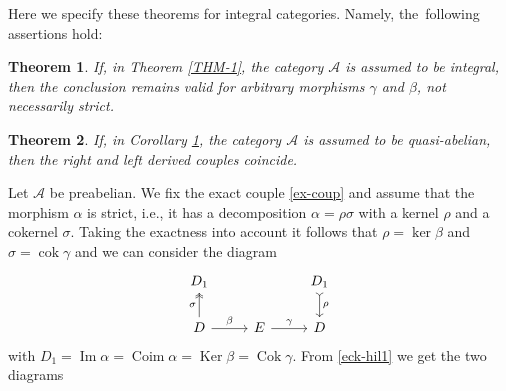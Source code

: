 \documentclass[a4paper,10pt,reqno]{amsart}
\newtheorem{thm}{Theorem}[section]
\newcommand{\Ker}{\operatorname{Ker}\nolimits}
\newcommand{\Cok}{\operatorname{Cok}\nolimits}
\newcommand{\cok}{\operatorname{cok}\nolimits}
\renewcommand{\Im}{\operatorname{Im}\nolimits}
\newcommand{\Coim}{\operatorname{Coim}\nolimits}
\begin{document}
	Here we specify these theorems for integral categories. Namely, the~following assertions hold: 
	
	\begin{thm}\label{COR-1}
		If, in Theorem \ref{THM-1}, the category $\mathcal{A}$ is assumed to be integral, then the conclusion remains valid for arbitrary morphisms $\gamma$ and $\beta$, not necessarily strict.
	\end{thm}
	
	\begin{thm}\label{COR-2}
		If, in Corollary \ref{COR-1}, the category $\mathcal{A}$ is assumed to be quasi-abelian, then the right and left derived couples coincide.
	\end{thm}
	
	\smallskip
	
	Let $\mathcal{A}$ be preabelian. We fix the exact couple \eqref{ex-coup} and assume that the morphism $\alpha$ is strict, i.e., it has a decomposition $\alpha=\rho\sigma$ with a kernel $\rho$ and a cokernel $\sigma$. Taking the exactness into account it follows that $\rho=\ker\beta$ and $\sigma=\cok\gamma$ and we can consider the diagram
	\begin{equation}\label{eck-hil1}
		\begin{tikzcd}
			D_1  & &D_1 \arrow[tail]{d}{\rho}\\
			D \arrow[two heads]{u}{\sigma} \arrow[]{r}{\beta} & E \arrow[]{r}{\gamma}&  D
		\end{tikzcd}
	\end{equation}
	with $D_1=\Im\alpha=\Coim\alpha=\Ker\beta=\Cok\gamma$. From \eqref{eck-hil1} we get the two diagrams
\end{document}
